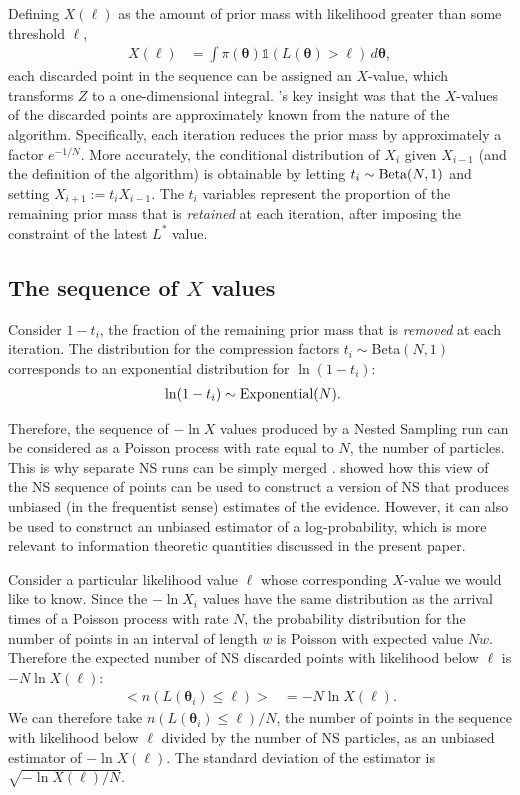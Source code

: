 \documentclass[entropy,article,accept,oneauthor,pdftex,10pt,a4paper]{mdpi}
\newcommand{\x}{\boldsymbol{\theta}}
\begin{document}
Defining $X(\ell)$ as the amount of prior mass with likelihood greater than
some threshold $\ell$,
\begin{align}
X(\ell) &= \int \pi(\x) \mathds{1}\left(L(\x) > \ell\right) \, d\x,
\end{align}
each discarded point in the sequence can be assigned an $X$-value,
which transforms $Z$ to a one-dimensional integral.
\citet{skilling2006nested}'s key insight was that the
$X$-values of the discarded points are approximately known from the nature of the
algorithm. Specifically, each iteration reduces the prior mass by approximately
a factor $e^{-1/N}$. More accurately, the conditional distribution of
$X_{i}$ given $X_{i-1}$ (and the definition of the algorithm)
is obtainable by letting
$t_i \sim \textnormal{Beta}(N,1)$ and setting $X_{i+1} := t_iX_{i-1}$.
The $t_i$ variables represent the proportion of the remaining prior mass
that is {\em retained} at each iteration, after imposing the constraint of the
latest $L^*$ value.

\subsection{The sequence of $X$ values}

Consider $1-t_i$, the fraction of the remaining prior mass that is {\em removed}
at each iteration.
The distribution for the compression factors $t_i \sim $Beta$(N,1)$
corresponds to an exponential distribution for $\ln(1-t_i)$:
\begin{align}
\ln (1 - t_i) &\sim \textnormal{Exponential}(N).
\end{align}

Therefore,
the sequence of $-\ln X$ values produced by a Nested Sampling run can be
considered as a Poisson process with rate equal to $N$, the number of
particles. This is why separate NS runs can be simply merged
\citep{skilling2006nested}.
\citet{Walter2015} showed how this view of the NS sequence of points
can be used to construct a
version of NS that produces unbiased (in the frequentist sense)
estimates of the evidence.
However, it can also be used to construct an unbiased estimator of
a log-probability, which is more relevant to information theoretic
quantities discussed in the present paper.

Consider a particular likelihood value $\ell$ whose corresponding $X$-value
we would like to know. Since the $-\ln X_i$ values have the same distribution
as the arrival times of a Poisson process with rate $N$, the probability
distribution for the number of points in an interval of length $w$ is
Poisson with expected value $Nw$. Therefore the expected number of
NS discarded points with likelihood below $\ell$ is $-N\ln X(\ell)$:
\begin{align}
\big< n(L(\x_i) \leq \ell) \big> &= -N\ln X(\ell).
\end{align}
We can therefore take $n(L(\x_i) \leq \ell)/N$, the number of points in the
sequence with likelihood below $\ell$ divided by the number of NS particles,
as an unbiased estimator of $-\ln X(\ell)$. The standard deviation of the
estimator is $\sqrt{-\ln X(\ell)/N}$.
\end{document}
